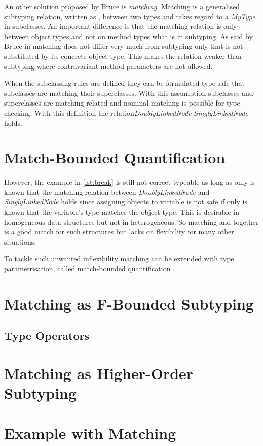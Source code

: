 An other solution proposed by Bruce \cite{bruce_binary_1995} is
\emph{matching}. Matching is a generalised subtyping relation, written
as \match, between two types and takes regard to a \emph{MyType} in
subclasses. An important difference is that the matching relation is only
between object types and not on method types what is in subtyping. As
said by Bruce in \cite{bruce_foundations_2002} matching does not differ
very much from subtyping only that \MyType is not substituted by its
concrete object type. This makes the relation weaker than subtyping
where contravariant method parameters are not allowed.

When the subclassing rules are defined they can be formulated
type safe that subclasses are matching their superclasses. With
this assumption subclasses and superclasses are matching related and
nominal matching is possible for type checking. With this definition
the relation\emph{DoublyLinkedNode} \match \emph{SinglyLinkedNode} holds.






\section{Match-Bounded Quantification}
However, the example in \autoref{lst:break} is still not correct
typeable as long as only is known that the matching relation between
\emph{DoublyLinkedNode} and \emph{SinglyLinkedNode} holds since assigning
objects to variable is not safe if only is known that the variable's type
matches the object type. This is desirable in homogeneous data structures
but not in heterogeneous. So matching and \MyType together is a good match
for such structures but lacks on flexibility for many other situations.

To tackle such unwanted inflexibility matching can be extended
with type parametrisation, called match-bounded quantification
\cite{abadi_subtyping_1996}. 
\section{Matching as F-Bounded Subtyping}
\subsection{Type Operators}


\section{Matching as Higher-Order Subtyping}

\section{Example with Matching}

